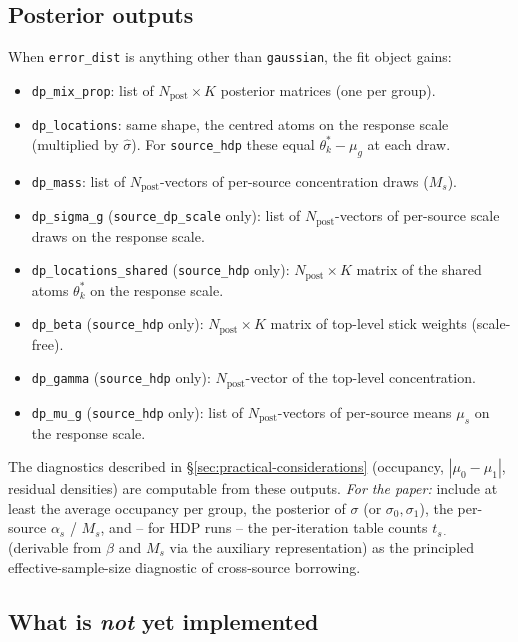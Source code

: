 \documentclass[11pt]{article}
\newcommand{\1}{\mathbf{1}}
\begin{document}
\subsection{Posterior outputs}

When \texttt{error\_dist} is anything other than \texttt{gaussian}, the fit object gains:
\begin{itemize}[noitemsep]
  \item \texttt{dp\_mix\_prop}: list of $N_\mathrm{post} \times K$ posterior matrices (one per group).
  \item \texttt{dp\_locations}: same shape, the centred atoms on the response scale (multiplied by $\hat\sigma$). For \texttt{source\_hdp} these equal $\theta^*_k - \mu_g$ at each draw.
  \item \texttt{dp\_mass}: list of $N_\mathrm{post}$-vectors of per-source concentration draws ($M_s$).
  \item \texttt{dp\_sigma\_g} (\texttt{source\_dp\_scale} only): list of $N_\mathrm{post}$-vectors of per-source scale draws on the response scale.
  \item \texttt{dp\_locations\_shared} (\texttt{source\_hdp} only): $N_\mathrm{post} \times K$ matrix of the shared atoms $\theta^*_k$ on the response scale.
  \item \texttt{dp\_beta} (\texttt{source\_hdp} only): $N_\mathrm{post} \times K$ matrix of top-level stick weights (scale-free).
  \item \texttt{dp\_gamma} (\texttt{source\_hdp} only): $N_\mathrm{post}$-vector of the top-level concentration.
  \item \texttt{dp\_mu\_g} (\texttt{source\_hdp} only): list of $N_\mathrm{post}$-vectors of per-source means $\mu_s$ on the response scale.
\end{itemize}
The diagnostics described in \S\ref{sec:practical-considerations} (occupancy, $|\mu_0 - \mu_1|$, residual densities) are computable from these outputs. \emph{For the paper:} include at least the average occupancy per group, the posterior of $\sigma$ (or $\sigma_0, \sigma_1$), the per-source $\alpha_s$ / $M_s$, and -- for HDP runs -- the per-iteration table counts $t_{s\cdot}$ (derivable from $\beta$ and $M_s$ via the auxiliary representation) as the principled effective-sample-size diagnostic of cross-source borrowing.

\subsection{What is \emph{not} yet implemented}\label{sec:impl-todo}
\end{document}
